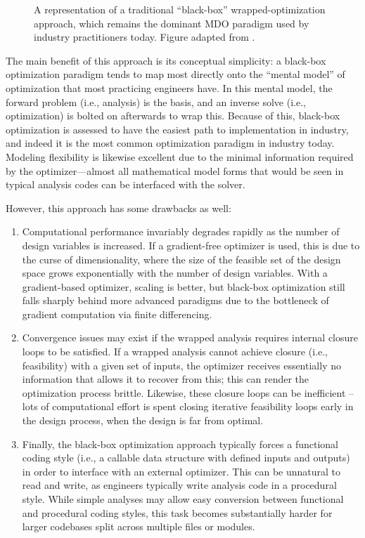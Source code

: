 \begin{figure}[H]
    \centering
    
    \caption{A representation of a traditional ``black-box'' wrapped-optimization approach, which remains the dominant MDO paradigm used by industry practitioners today. Figure adapted from \cite{drela_simultaneous_2010}.}
    \label{fig:nested}
\end{figure}

The main benefit of this approach is its conceptual simplicity: a black-box optimization paradigm tends to map most directly onto the ``mental model'' of optimization that most practicing engineers have. In this mental model, the forward problem (i.e., analysis) is the basis, and an inverse solve (i.e., optimization) is bolted on afterwards to wrap this. Because of this, black-box optimization is assessed to have the easiest path to implementation in industry, and indeed it is the most common optimization paradigm in industry today. Modeling flexibility is likewise excellent due to the minimal information required by the optimizer—almost all mathematical model forms that would be seen in typical analysis codes can be interfaced with the solver.

However, this approach has some drawbacks as well:
\begin{enumerate}
    \item Computational performance invariably degrades rapidly as the number of design variables is increased. If a gradient-free optimizer is used, this is due to the curse of dimensionality, where the size of the feasible set of the design space grows exponentially with the number of design variables. With a gradient-based optimizer, scaling is better, but black-box optimization still falls sharply behind more advanced paradigms due to the bottleneck of gradient computation via finite differencing.
    \item Convergence issues may exist if the wrapped analysis requires internal closure loops to be satisfied. If a wrapped analysis cannot achieve closure (i.e., feasibility) with a given set of inputs, the optimizer receives essentially no information that allows it to recover from this; this can render the optimization process brittle. Likewise, these closure loops can be inefficient -- lots of computational effort is spent closing iterative feasibility loops early in the design process, when the design is far from optimal.
    \item Finally, the black-box optimization approach typically forces a functional coding style (i.e., a callable data structure with defined inputs and outputs) in order to interface with an external optimizer. This can be unnatural to read and write, as engineers typically write analysis code in a procedural style. While simple analyses may allow easy conversion between functional and procedural coding styles, this task becomes substantially harder for larger codebases split across multiple files or modules.
\end{enumerate}

